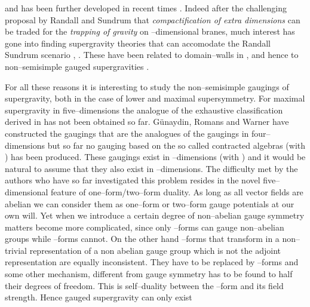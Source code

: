 \documentclass[a4paper,12pt]{article}
\begin{document}
and has been further developed in recent times \cite{Cvetic:2000pn,Cvetic:2000ah}.
Indeed after the challenging proposal by Randall and Sundrum \cite{Randalsud}
that {\it compactification of extra dimensions} can be traded for the {\it trapping of
gravity} on \coordHE{}--dimensional branes, much interest has gone into finding
supergravity theories that can accomodate the Randall Sundrum scenario
\cite{Ceresole:2000jd}, \cite{newduffo} . These
have been related to domain--walls in \cite{Cvetic:2000pn},
and hence to non--semisimple gauged supergravities \cite{Boonstra:1999mp}.
\par
For all these reasons it is interesting to study the
non--semisimple gaugings of \coordHE{} supergravity, both in the case
of lower and maximal supersymmetry. For maximal \coordHE{}
supergravity in five--dimensions the analogue of the \coordHE{}
exhaustive classification derived in \cite{noi4D} has not been
obtained so far.  G\"unaydin, Romans and Warner have constructed
the \coordHE{} gaugings \cite{gunwar} that are the
analogues of the \coordHE{} gaugings in four--dimensions
but so far no gauging based on the so called \coordHE{}
contracted algebras (with \coordHE{}) has been produced. These
gaugings exist in \coordHE{}--dimensions (with \coordHE{}) and it would be
natural to assume that they also exist in \coordHE{}--dimensions. The
difficulty met by the authors who have so far investigated this
problem resides in the novel five--dimensional feature of
one--form/two--form duality.  As long as all vector fields are
abelian we can consider them as one--form or two--form gauge
potentials at our own will. Yet when we introduce a certain degree
of non--abelian gauge symmetry matters become more complicated,
since only \coordHE{}--forms can gauge non--abelian groups while
\coordHE{}--forms cannot. On the other hand \coordHE{}--forms that transform in
a non--trivial representation of a non abelian gauge group which
is not the adjoint representation are equally inconsistent. They
have to be replaced by \coordHE{}--forms and some other mechanism,
different from gauge symmetry has to be found to half their
degrees of freedom. This is self--duality between the \coordHE{}--form
and its field strength. Hence gauged supergravity can only exist
\end{document}
